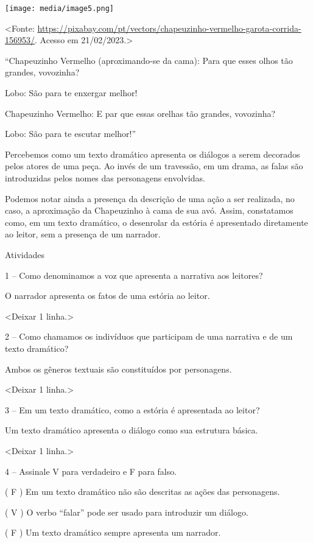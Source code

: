 \texttt{[image: media/image5.png]}

\textless{}Fonte:
\url{https://pixabay.com/pt/vectors/chapeuzinho-vermelho-garota-corrida-156953/}.
Acesso em 21/02/2023.\textgreater{}

``Chapeuzinho Vermelho (aproximando-se da cama): Para que esses olhos
tão grandes, vovozinha?

Lobo: São para te enxergar melhor!

Chapeuzinho Vermelho: E par que essas orelhas tão grandes, vovozinha?

Lobo: São para te escutar melhor!''

Percebemos como um texto dramático apresenta os diálogos a serem
decorados pelos atores de uma peça. Ao invés de um travessão, em um
drama, as falas são introduzidas pelos nomes das personagens envolvidas.

Podemos notar ainda a presença da descrição de uma ação a ser realizada,
no caso, a aproximação da Chapeuzinho à cama de sua avó. Assim,
constatamos como, em um texto dramático, o desenrolar da estória é
apresentado diretamente ao leitor, sem a presença de um narrador.

Atividades

1 -- Como denominamos a voz que apresenta a narrativa aos leitores?

O narrador apresenta os fatos de uma estória ao leitor.

\textless{}Deixar 1 linha.\textgreater{}

2 -- Como chamamos os indivíduos que participam de uma narrativa e de um
texto dramático?

Ambos os gêneros textuais são constituídos por personagens.

\textless{}Deixar 1 linha.\textgreater{}

3 -- Em um texto dramático, como a estória é apresentada ao leitor?

Um texto dramático apresenta o diálogo como sua estrutura básica.

\textless{}Deixar 1 linha.\textgreater{}

4 -- Assinale V para verdadeiro e F para falso.

( F ) Em um texto dramático não são descritas as ações das personagens.

( V ) O verbo ``falar'' pode ser usado para introduzir um diálogo.

( F ) Um texto dramático sempre apresenta um narrador.

